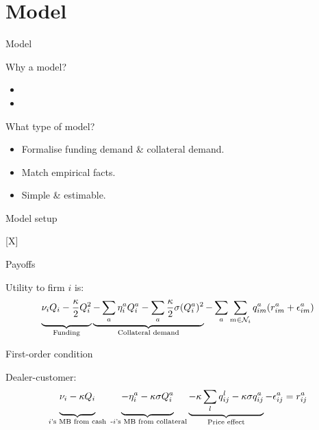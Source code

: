 \documentclass{beamer}
\begin{document}

\section{Model}

\begin{frame}{Model}

Why a model?

\begin{itemize}
\item 
\item 
\end{itemize}

What type of model?

\begin{itemize}
\item Formalise funding demand \& collateral demand.
\item Match empirical facts. 
\item Simple \& estimable.
\end{itemize}

\end{frame}


\begin{frame}{Model setup}

[X]

\end{frame}


\begin{frame}{Payoffs}

Utility to firm $i$ is:
\begin{equation*}
    \underbrace{\vphantom{\sum_a}\nu_{i}Q_{i}-\frac{\kappa}{2}Q^2_{i}}_{\text{Funding}}\underbrace{-\sum_a \eta_{i}^a Q^a_{i}-\sum_a \frac{\kappa}{2}\sigma (Q^a_{i})^2}_{\text{Collateral demand}}-\sum_a \sum_{m \in \mathcal{N}_i}  q^a_{im}(r^a_{im}+\epsilon^a_{im})
\end{equation*}

\end{frame}


\begin{frame}{First-order condition}

Dealer-customer:
\begin{equation*}
    \underbrace{\vphantom{\sum_m}\nu_{i}-\kappa Q_{i}}_\text{$i$'s MB from cash}\underbrace{-\eta^a_{i}-\kappa \sigma  Q^a_{i}\vphantom{\sum_m}}_\text{ -$i$'s MB from collateral} \underbrace{-\kappa \sum_l q^l_{ij}-\kappa \sigma q^a_{ij} }_\text{Price effect}-\epsilon^a_{ij}=r^a_{ij}
\end{equation*}

\end{frame}
\end{document}
